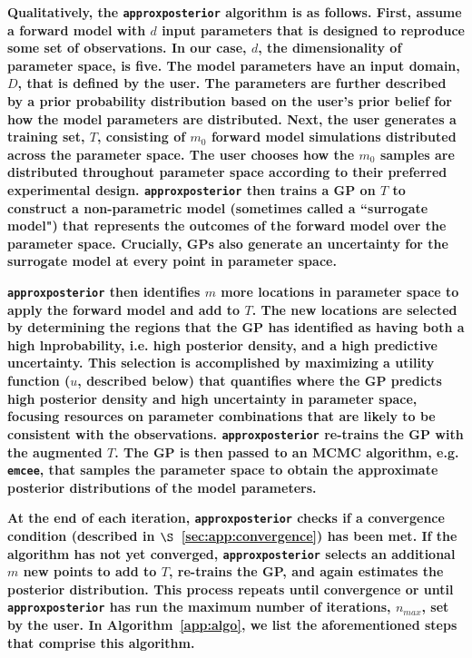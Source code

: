 \documentclass[twocolumn]{aastex62}
\newcommand{\xxx}[1]{{\textbf{#1}}}
\newcommand{\emcee}[0]{\texttt{emcee}\xspace}
\newcommand{\approxposterior}[0]{\texttt{approxposterior}\xspace}
\begin{document}
\xxx{Qualitatively, the \approxposterior algorithm is as follows. First, assume a forward model with $d$ input parameters that is designed to reproduce some set of observations. In our case, $d$, the dimensionality of parameter space, is five. The model parameters have an input domain, $D$, that is defined by the user. The parameters are further described by a prior probability distribution based on the user's prior belief for how the model parameters are distributed.  Next, the user generates a training set, $T$, consisting of $m_0$ forward model simulations distributed across the parameter space. The user chooses how the $m_0$ samples are distributed throughout parameter space according to their preferred experimental design. \approxposterior then trains a GP on $T$ to construct a non-parametric model (sometimes called a ``surrogate model") that represents the outcomes of the forward model over the parameter space. Crucially, GPs also generate an uncertainty for the surrogate model at every point in parameter space.}

\xxx{\approxposterior then identifies $m$ more locations in parameter space to apply the forward model and add to $T$. The new locations are selected by determining the regions that the GP has identified as having both a high lnprobability, i.e. high posterior density, and a high predictive uncertainty. This selection is accomplished by maximizing a utility function ($u$, described below) that quantifies where the GP predicts high posterior density and high uncertainty in parameter space, focusing resources on parameter combinations that are likely to be consistent with the observations. \approxposterior re-trains the GP with the augmented $T$. The GP is then passed to an MCMC algorithm, e.g. \emcee, that samples the parameter space to obtain the approximate posterior distributions of the model parameters.}

\xxx{At the end of each iteration, \approxposterior checks if a convergence condition (described in $\S$~\ref{sec:app:convergence}) has been met. If the algorithm  has not yet converged, \approxposterior selects an additional $m$ new points to add to $T$, re-trains the GP, and again estimates the posterior distribution. This process repeats until convergence or until \approxposterior has run the maximum number of iterations, $n_{max}$, set by the user. In Algorithm~\ref{app:algo}, we list the aforementioned steps that comprise this algorithm.}
\end{document}
